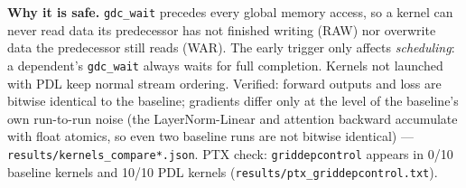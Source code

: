 \documentclass[10pt]{article}
\begin{document}
\begin{table}[H]\centering\small
{}
\end{table}

\textbf{Why it is safe.} \texttt{gdc\_wait} precedes every global memory access, so a kernel can never read data its predecessor has not finished writing (RAW) nor overwrite data the predecessor still reads (WAR). The early trigger only affects \emph{scheduling}: a dependent's \texttt{gdc\_wait} always waits for full completion. Kernels not launched with PDL keep normal stream ordering. Verified: forward outputs and loss are bitwise identical to the baseline; gradients differ only at the level of the baseline's own run-to-run noise (the LayerNorm-Linear and attention backward accumulate with float atomics, so even two baseline runs are not bitwise identical) --- \texttt{results/kernels\_compare*.json}. PTX check: \texttt{griddepcontrol} appears in 0/10 baseline kernels and 10/10 PDL kernels (\texttt{results/ptx\_griddepcontrol.txt}).
\end{document}
